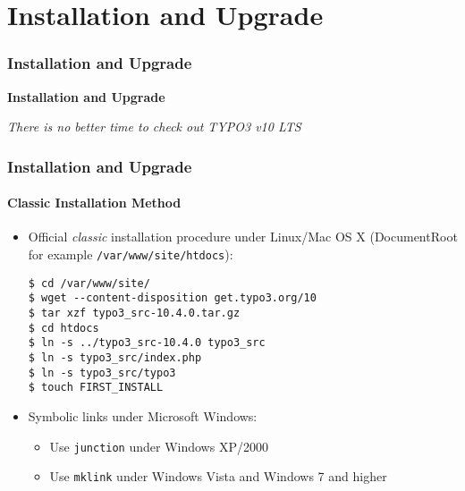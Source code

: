 %

\section{Installation and Upgrade}
\begin{frame}[fragile]
	\frametitle{Installation and Upgrade}

	\begin{center}\huge{\color{typo3darkgrey}\textbf{Installation and Upgrade}}\end{center}
	\begin{center}\large{\textit{There is no better time to check out TYPO3 v10 LTS}}\end{center}

\end{frame}


\begin{frame}[fragile]
	\frametitle{Installation and Upgrade}
	\framesubtitle{Classic Installation Method}

	\begin{itemize}
		\item Official \textit{classic} installation procedure under Linux/Mac OS X\newline
			(DocumentRoot for example \texttt{/var/www/site/htdocs}):
\begin{lstlisting}
$ cd /var/www/site/
$ wget --content-disposition get.typo3.org/10
$ tar xzf typo3_src-10.4.0.tar.gz
$ cd htdocs
$ ln -s ../typo3_src-10.4.0 typo3_src
$ ln -s typo3_src/index.php
$ ln -s typo3_src/typo3
$ touch FIRST_INSTALL
\end{lstlisting}

		\item Symbolic links under Microsoft Windows:

			\begin{itemize}
				\item Use \texttt{junction} under Windows XP/2000
				\item Use \texttt{mklink} under Windows Vista and Windows 7 and higher
			\end{itemize}

	\end{itemize}
\end{frame}

